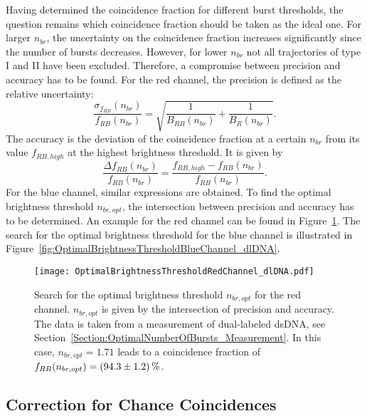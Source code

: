 Having determined the coincidence fraction for different burst thresholds, the question remains which coincidence fraction should be taken as the ideal one. For larger $n_{br}$, the uncertainty on the coincidence fraction increases significantly since the number of bursts decreases. However, for lower $n_{br}$ not all trajectories of type I and II have been excluded. Therefore, a compromise between precision and accuracy has to be found. For the red channel, the precision is defined as the relative uncertainty:
\begin{equation} \label{Equation:PrecisionCoincidenceFractionRed}
	\frac{\sigma_{f_{RB}}(n_{br})}{f_{RB}(n_{br})} = \sqrt{\frac{1}{B_{RB}(n_{br})} + \frac{1}{B_{R}(n_{br})}}.
\end{equation} 
The accuracy is the deviation of the coincidence fraction at a certain $n_{br}$ from its value $f_{RB,high}$ at the highest brightness threshold. It is given by
\begin{equation}
	\frac{\Delta f_{RB}(n_{br})}{f_{RB}(n_{br})} = \frac{f_{RB,high} - f_{RB}(n_{br})}{f_{RB}(n_{br})}.
\end{equation}
For the blue channel, similar expressions are obtained. To find the optimal brightness threshold $n_{br, opt}$, the intersection between precision and accuracy has to be determined. An example for the red channel can be found in Figure~\ref{fig:OptimalBrightnessThresholdRedChannel_dlDNA}. The search for the optimal brightness threshold for the blue channel is illustrated in Figure~\ref{fig:OptimalBrightnessThresholdBlueChannel_dlDNA}.

\begin{figure}[h]
	\centering
	\texttt{[image: OptimalBrightnessThresholdRedChannel\_dlDNA.pdf]}
	\caption[Search for optimal brightness threshold $n_{br, opt}$ for red channel]{Search for the optimal brightness threshold $n_{br, opt}$ for the red channel. $n_{br, opt}$ is given by the intersection of precision and accuracy. The data is taken from a measurement of dual-labeled \gls{dsDNA}, see Section~\ref{Section:OptimalNumberOfBursts_Measurement}. In this case, $n_{br, opt}=\num{1.71}$ leads to a coincidence fraction of $f_{RB}(n_{br, opt}) = \SI{94.3 +- 1.2}{\percent}$.}
	\label{fig:OptimalBrightnessThresholdRedChannel_dlDNA}
\end{figure}

\subsection{Correction for Chance Coincidences} \label{Section:CorrectionForChanceCoincidences}

